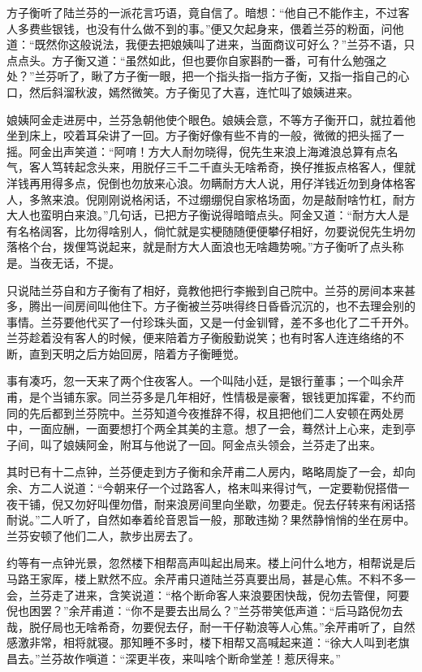 \documentclass[12pt,UTF8]{ctexbook}
\begin{document}
{{{方子衡听了陆兰芬的一派花言巧语，竟自信了。暗想：“他自己不能作主，不过客人多费些银钱，也没有什么做不到的事。”便又欠起身来，偎着兰芬的粉面，问他道：“既然你这般说法，我便去把娘姨叫了进来，当面商议可好么？”兰芬不语，只点点头。方子衡又道：“虽然如此，但也要你自家斟酌一番，可有什么勉强之处？”兰芬听了，瞅了方子衡一眼，把一个指头指一指方子衡，又指一指自己的心口，然后斜溜秋波，嫣然微笑。方子衡见了大喜，连忙叫了娘姨进来。

娘姨阿金走进房中，兰芬急朝他使个眼色。娘姨会意，不等方子衡开口，就拉着他坐到床上，咬着耳朵讲了一回。方子衡好像有些不肯的一般，微微的把头摇了一摇。阿金出声笑道：“阿唷！方大人耐勿晓得，倪先生来浪上海滩浪总算有点名气，客人笃转起念头来，用脱仔三千二千直头无啥希奇，换仔推扳点格客人，俚就洋钱再用得多点，倪倒也勿放来心浪。勿瞒耐方大人说，用仔洋钱近勿到身体格客人，多煞来浪。倪刚刚说格闲话，不过绷绷倪自家格场面，勿是敲耐啥竹杠，耐方大人也蛮明白来浪。”几句话，已把方子衡说得暗暗点头。阿金又道：“耐方大人是有名格阔客，比勿得啥别人，倘忙就是实梗随随便便攀仔相好，勿要说倪先生坍勿落格个台，拨俚笃说起来，就是耐方大人面浪也无啥趣势啘。”方子衡听了点头称是。当夜无话，不提。

只说陆兰芬自和方子衡有了相好，竟教他把行李搬到自己院中。兰芬的房间本来甚多，腾出一间房间叫他住下。方子衡被兰芬哄得终日昏昏沉沉的，也不去理会别的事情。兰芬要他代买了一付珍珠头面，又是一付金钏臂，差不多也化了二千开外。兰芬趁着没有客人的时候，便来陪着方子衡殷勤说笑；也有时客人连连络络的不断，直到天明之后方始回房，陪着方子衡睡觉。

事有凑巧，忽一天来了两个住夜客人。一个叫陆小廷，是银行董事；一个叫余芹甫，是个当铺东家。同兰芬多是几年相好，性情极是豪奢，银钱更加挥霍，不约而同的先后都到兰芬院中。兰芬知道今夜推辞不得，权且把他们二人安顿在两处房中，一面应酬，一面要想打个两全其美的主意。想了一会，蓦然计上心来，走到亭子间，叫了娘姨阿金，附耳与他说了一回。阿金点头领会，兰芬走了出来。

其时已有十二点钟，兰芬便走到方子衡和余芹甫二人房内，略略周旋了一会，却向余、方二人说道：“今朝来仔一个过路客人，格末叫来得讨气，一定要勒倪搭借一夜干铺，倪又勿好叫俚勿借，耐来浪房间里向坐歇，勿要走。倪去仔转来有闲话搭耐说。”二人听了，自然如奉着纶音恩旨一般，那敢违拗？果然静悄悄的坐在房中。兰芬安顿了他们二人，款步出房去了。

约等有一点钟光景，忽然楼下相帮高声叫起出局来。楼上问什么地方，相帮说是后马路王家厍，楼上默然不应。余芹甫只道陆兰芬真要出局，甚是心焦。不料不多一会，兰芬走了进来，含笑说道：“格个断命客人来浪要困快哉，倪勿去管俚，阿要倪也困罢？”余芹甫道：“你不是要去出局么？”兰芬带笑低声道：“后马路倪勿去哉，脱仔局也无啥希奇，勿要倪去仔，耐一干仔勒浪等人心焦。”余芹甫听了，自然感激非常，相将就寝。那知睡不多时，楼下相帮又高喊起来道：“徐大人叫到老旗昌去。”兰芬故作嗔道：“深更半夜，来叫啥个断命堂差！惹厌得来。”

}}}
\end{document}
